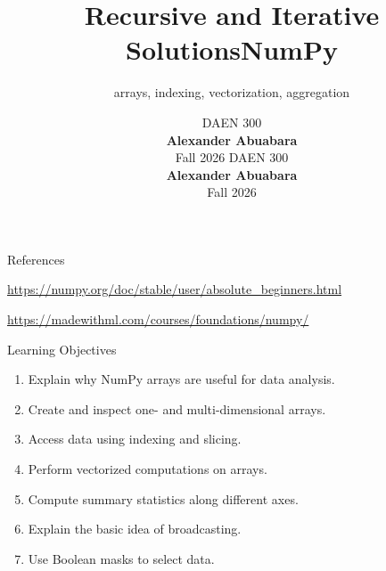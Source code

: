 \documentclass[11pt,aspectratio=43]{beamer}
\title{Recursive and Iterative Solutions}
\author{}
\date{
  \textcolor{aggiemaroon}{
    DAEN 300\\
    \textbf{Alexander Abuabara}\\
    Fall 2026
  }
}
\title{NumPy}
\subtitle{arrays, indexing, vectorization, aggregation}
\author{}
\date{%
\textcolor{aggiemaroon}{
DAEN 300\\
\textbf{Alexander Abuabara}\\
Fall 2026
}
}
\begin{document}
\begin{frame}
\titlepage
\end{frame}

\begin{frame}{References}

\url{https://numpy.org/doc/stable/user/absolute_beginners.html}

\url{https://madewithml.com/courses/foundations/numpy/}

\end{frame}

\begin{frame}{Learning Objectives}

\begin{enumerate}
\item Explain why NumPy arrays are useful for data analysis.
\item Create and inspect one- and multi-dimensional arrays.
\item Access data using indexing and slicing.
\item Perform vectorized computations on arrays.
\item Compute summary statistics along different axes.
\item Explain the basic idea of broadcasting.
\item Use Boolean masks to select data.
\end{enumerate}

\end{frame}
\end{document}
